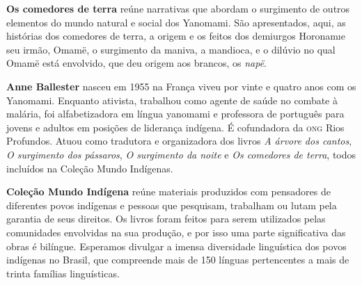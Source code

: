 \textbf{Os comedores de terra} reúne narrativas que abordam o surgimento de outros elementos
do mundo natural e social dos Yanomami. São apresentados, aqui, as histórias dos comedores de terra, 
a origem e os feitos dos demiurgos Horonam\i e seu irmão, Omamë, o surgimento da maniva, a mandioca,
e o dilúvio no qual Omamë está envolvido, que deu origem aos brancos, os \textit{napë}.

\textbf{Anne Ballester} nasceu em 1955 na França viveu por vinte e quatro anos com os Yanomami. 
Enquanto ativista, trabalhou como agente de saúde no combate à malária, foi alfabetizadora em língua 
yanomami e professora de português para jovens e adultos em posições de liderança indígena. É cofundadora da \textsc{ong} Rios Profundos. Atuou como tradutora e organizadora dos livros \textit{A árvore dos cantos}, \textit{O surgimento dos pássaros}, \textit{O surgimento da noite} e \textit{Os comedores de terra}, todos incluídos na Coleção Mundo Indígenas.

\textbf{Coleção Mundo Indígena} reúne materiais produzidos com pensadores de diferentes povos indígenas e pessoas que pesquisam, trabalham ou lutam pela garantia de seus direitos. Os livros foram feitos para serem utilizados pelas comunidades envolvidas na sua produção, e por isso uma parte significativa das obras é bilíngue. Esperamos divulgar a imensa diversidade linguística dos povos indígenas no Brasil, que compreende mais de 150 línguas pertencentes a mais de trinta famílias linguísticas.



